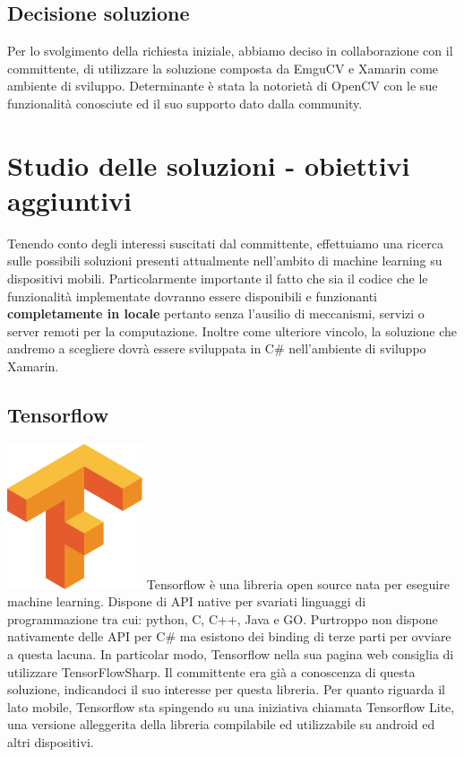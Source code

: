 \documentclass[twoside]{supsistudent}
\newcommand{\Decaa}{\newline\vspace{0.5mm}\newline\noindent}
\begin{document}
\subsection{Decisione soluzione}
Per lo svolgimento della richiesta iniziale, abbiamo deciso in collaborazione con il committente, di utilizzare la soluzione composta da EmguCV e Xamarin come ambiente di sviluppo. Determinante è stata la notorietà di OpenCV con le sue funzionalità conosciute ed il suo supporto dato dalla community.

\section{Studio delle soluzioni - obiettivi aggiuntivi}
Tenendo conto degli interessi suscitati dal committente, effettuiamo una ricerca sulle possibili soluzioni presenti attualmente nell'ambito di machine learning su dispositivi mobili.
\Decaa
Particolarmente importante il fatto che sia il codice che le funzionalità implementate dovranno essere disponibili e funzionanti \textbf{completamente in locale} pertanto senza l'ausilio di meccanismi, servizi o server remoti per la computazione.
\Decaa
Inoltre come ulteriore vincolo, la soluzione che andremo a scegliere dovrà essere sviluppata in C\# nell'ambiente di sviluppo Xamarin.

\subsection{Tensorflow}
\includegraphics[width=0.3\textwidth]{Pictures/Tensorflow_logo.png}
\newline
Tensorflow è una libreria open source nata per eseguire machine learning.
Dispone di API native per svariati linguaggi di programmazione tra cui: python, C, C++, Java e GO. Purtroppo non dispone nativamente delle API per C\# ma esistono dei binding di terze parti per ovviare a questa lacuna.
\Decaa
In particolar modo, Tensorflow nella sua pagina web consiglia di utilizzare TensorFlowSharp\cite{tensorflowSharp}.
\Decaa
Il committente era già a conoscenza di questa soluzione, indicandoci il suo interesse per questa libreria.
\Decaa
Per quanto riguarda il lato mobile, Tensorflow sta spingendo su una iniziativa chiamata Tensorflow Lite, una versione alleggerita della libreria compilabile ed utilizzabile su android ed altri dispositivi.
\end{document}
